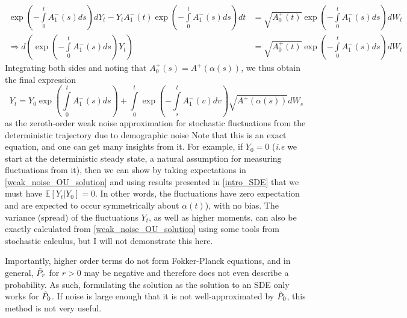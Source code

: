 \begin{align*}
\exp\left(-{\int\limits_{0}^{t}A^-_1(s)ds}\right)dY_t - Y_tA^-_1(t)\exp\left(-{\int\limits_{0}^{t}A^-_1(s)ds}\right)dt &= \sqrt{A^+_0(t)}\exp\left(-{\int\limits_{0}^{t}A^-_1(s)ds}\right)dW_t\\
\Rightarrow d\left(\exp\left(-{\int\limits_{0}^{t}A^-_1(s)ds}\right)Y_t\right) &= \sqrt{A^+_0(t)}\exp\left(-{\int\limits_{0}^{t}A^-_1(s)ds}\right)dW_t
\end{align*}
Integrating both sides and noting that $A^+_0(s) = A^+(\alpha(s))$, we thus obtain the final expression
\begin{equation}
\label{weak_noise_OU_solution}
Y_t = Y_0\exp\left({\int\limits_{0}^{t}A^-_1(s)ds}\right)+\int\limits_{0}^{t}\exp\left(-\int\limits_{s}^{t}A^-_{1}(v)dv\right)\sqrt{A^+(\alpha(s))}dW_s
\end{equation}
as the zeroth-order weak noise approximation for stochastic fluctuations from the deterministic trajectory due to demographic noise Note that this is an exact equation, and one can get many insights from it. For example, if $Y_0 = 0$ (\emph{i.e} we start at the deterministic steady state, a natural assumption for measuring fluctuations from it), then we can show by taking expectations in \eqref{weak_noise_OU_solution} and using results presented in \ref{intro_SDE} that we must have $\mathbb{E}[Y_t | Y_0] = 0$. In other words, the fluctuations have zero expectation and are expected to occur symmetrically about $\alpha(t)$), with no bias. The variance (spread) of the fluctuations $Y_t$, as well as higher moments, can also be exactly calculated from \eqref{weak_noise_OU_solution} using some tools from stochastic calculus, but I will not demonstrate this here.

Importantly, higher order terms do not form Fokker-Planck equations, and in general, $\Tilde{P}_r$ for $r>0$ may be negative and therefore does not even describe a probability. As such, formulating the solution as the solution to an SDE only works for $\Tilde{P}_0$. If noise is large enough that it is not well-approximated by $\Tilde{P}_0$, this method is not very useful.